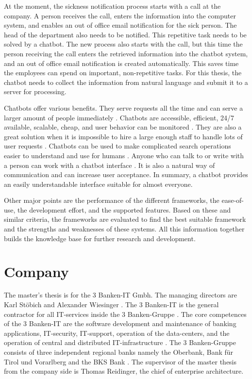 At the moment, the sickness notification process starts with a call at the company. 
A person receives the call, enters the information into the computer system, and enables an out of office email notification for the sick person. 
The head of the department also needs to be notified. 
This repetitive task needs to be solved by a chatbot. 
The new process also starts with the call, but this time the person receiving the call enters the retrieved information into the chatbot system, and an out of office email notification is created automatically. 
This saves time the employees can spend on important, non-repetitive tasks.
For this thesis, the chatbot needs to collect the information from natural language and submit it to a server for processing.

Chatbots offer various benefits.
They serve requests all the time and can serve a larger amount of people immediately \cite{kane2016role}.
Chatbots are accessible, efficient, 24/7 available, scalable, cheap, and user behavior can be monitored \cite{buiildChatbotsPython}.
They are also a great solution when it is impossible to hire a large enough staff to handle lots of user requests \cite{kane2016role}.
Chatbots can be used to make complicated search operations easier to understand and use for humans \cite{kane2016role}.
Anyone who can talk to or write with a person can work with a chatbot interface \cite{buiildChatbotsPython}.
It is also a natural way of communication and can increase user acceptance.
In summary, a chatbot provides an easily understandable interface suitable for almost everyone.

Other major points are the performance of the different frameworks, the ease-of-use, the development effort, and the supported features.
Based on these and similar criteria, the frameworks are evaluated to find the best suitable framework and the strengths and weaknesses of these systems.
All this information together builds the knowledge base for further research and development.

\section{Company}
The master's thesis is for the 3 Banken-IT Gmbh. The managing directors are Karl St\"obich and Alexander Wiesinger \cite{3bitorgani}. 
The 3 Banken-IT is the general contractor for all IT-services inside the 3 Banken-Gruppe \cite{3bitservices}. 
The core competences of the 3 Banken-IT are the software development and maintenance of banking applications, IT-security, 
IT-support, operation of the data-centers, and the operation of central and distributed IT-infrastructure \cite{3bitservices}. 
The 3 Banken-Gruppe consists of three independent regional banks namely the Oberbank, Bank für Tirol und Vorarlberg and the BKS Bank \cite{3bitcompany}. 
The supervisor of the master thesis from the company side is Thomas Reidinger, the chief of enterprise architecture.


